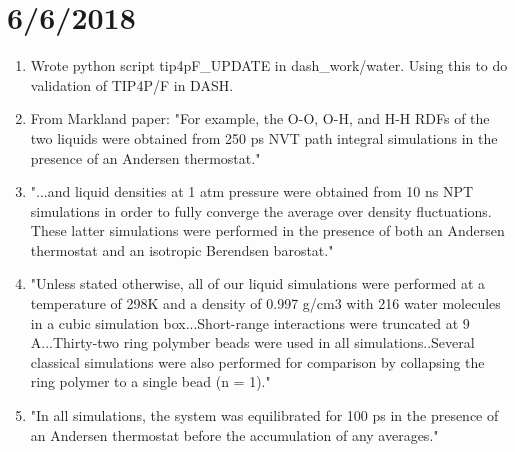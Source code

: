 \documentclass[12pt,reqno]{amsart}
\numberwithin{equation}{section}
\begin{document}
\section{6/6/2018}
\begin{enumerate}
\item Wrote python script tip4pF\_UPDATE in dash\_work/water.  Using this to do validation of TIP4P/F in DASH.  
\item From Markland paper: "For example, the O-O, O-H, and H-H RDFs of the two liquids were obtained from 250 ps NVT path integral simulations in the presence of an Andersen thermostat."
\item "...and liquid densities at 1 atm pressure were obtained from 10 ns NPT simulations in order to fully converge the average over density fluctuations.  These latter simulations were performed in the presence of both an Andersen thermostat and an isotropic Berendsen barostat."  
\item "Unless stated otherwise, all of our liquid simulations were performed at a temperature of 298K and a density of 0.997 g/cm3 with 216 water molecules in a cubic simulation box...Short-range interactions were truncated at 9 A...Thirty-two ring polymber beads were used in all simulations..Several classical simulations were also performed for comparison by collapsing the ring polymer to a single bead (n = 1)."
\item "In all simulations, the system was equilibrated for 100 ps in the presence of an Andersen thermostat before the accumulation of any averages."    
\end{enumerate}
\end{document}
